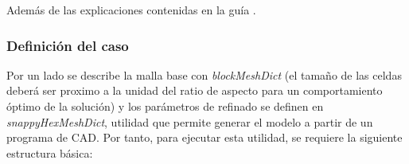 Además de las explicaciones contenidas en la guía
\cite{snappyHexMesh}.

\subsubsection{Definición del caso}\label{header-n855}

Por un lado se describe la malla base con \emph{blockMeshDict} (el
tamaño de las celdas deberá ser proximo a la unidad del ratio de aspecto
para un comportamiento óptimo de la solución) y los parámetros de
refinado se definen en \emph{snappyHexMeshDict}, utilidad que permite
generar el modelo a partir de un programa de CAD. Por tanto, para
ejecutar esta utilidad, se requiere la siguiente estructura básica:



